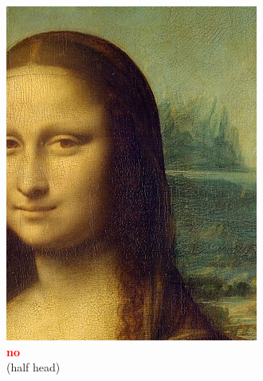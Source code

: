 \documentclass[hyperref={pdfpagelabels=false},aspectratio=169]{beamer}
\begin{document}
\begin{frame}
\begin{columns}[T,onlytextwidth]
\begin{figure}
\includegraphics[width=1\textwidth]{kopf_halb.jpg} \\
		\textcolor{red}{\textbf{no}}	\\(half head)
	\end{figure}
	\begin{figure} 
		\centering
		\def\svgwidth{1\textwidth}

\end{figure}
\end{columns}
\end{frame}
\end{document}
